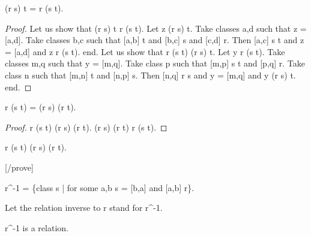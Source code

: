 \documentclass[a4paper,draft]{amsproc}
\begin{document}
\begin{forthel}
\begin{theorem}[58]
(r \circ s) \circ t = r \circ (s \circ t).
\end{theorem}
\begin{proof}
Let us show that (r \circ s) \circ t \subset r \circ (s \circ t).
  Let z \in (r \circ s) \circ t.
  Take classes a,d such that z = [a,d].
  Take classes b,c such that [a,b] \in t and [b,c] \in s and [c,d] \in r.
  Then [a,c] \in s \circ t and z = [a,d] and z \in r \circ (s \circ t).
end.
Let us show that r \circ (s \circ t) \subset (r \circ s) \circ t.
  Let y \in r \circ (s \circ t).
  Take classes m,q such that y = [m,q].
  Take class p such that [m,p] \in s \circ t and [p,q] \in r.
  Take class n such that [m,n] \in t and [n,p] \in s.
  Then [n,q] \in r \circ s and y = [m,q] and y \in (r \circ s) \circ t.
end.
\end{proof}

\begin{theorem}[59a]
r \circ (s \cup t) = (r \circ s) \cup (r \circ t).
\end{theorem}
\begin{proof}
r \circ (s \cup t) \subset (r \circ s) \cup (r \circ t).
(r \circ s) \cup (r \circ t) \subset r \circ (s \cup t).
\end{proof}

\begin{theorem}[59b]
r \circ (s \cap t) \subset (r \circ s) \cap (r \circ t).
\end{theorem}
[/prove]

\begin{definition}[60]
r^{-1} = \{class s | for some a,b s = [b,a] and [a,b] \in r\}.
\end{definition}
Let the relation inverse to r stand for r^{-1}.

\begin{lemma}
r^{-1} is a relation.
\end{lemma}


\end{forthel}
\end{document}
